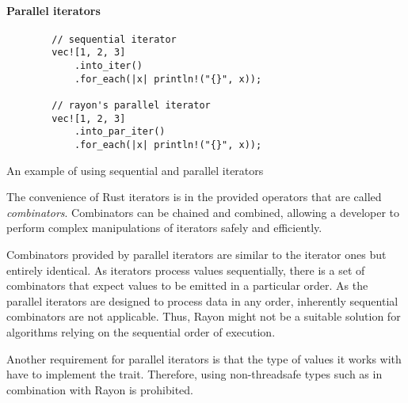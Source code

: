 \paragraph{Parallel iterators}
\begin{listing}[!htbp]
    \centering

    \begin{verbatim}
        // sequential iterator
        vec![1, 2, 3]
            .into_iter()
            .for_each(|x| println!("{}", x));

        // rayon's parallel iterator
        vec![1, 2, 3]
            .into_par_iter()
            .for_each(|x| println!("{}", x));
    \end{verbatim}

    \caption{An example of using sequential and parallel iterators}
    \label{lst:par-iter-example}
\end{listing}

The convenience of Rust iterators is in the provided operators that are called \emph{combinators}. Combinators can be chained and combined, allowing a developer to perform complex manipulations of iterators safely and efficiently.

Combinators provided by parallel iterators are similar to the iterator ones but entirely identical. As iterators process values sequentially, there is a set of combinators that expect values to be emitted in a particular order. As the parallel iterators are designed to process data in any order, inherently sequential combinators are not applicable. Thus, Rayon might not be a suitable solution for algorithms relying on the sequential order of execution.

Another requirement for parallel iterators is that the type of values it works with have to implement the  trait. Therefore, using non-threadsafe types such as \rc{} in combination with Rayon is prohibited.

